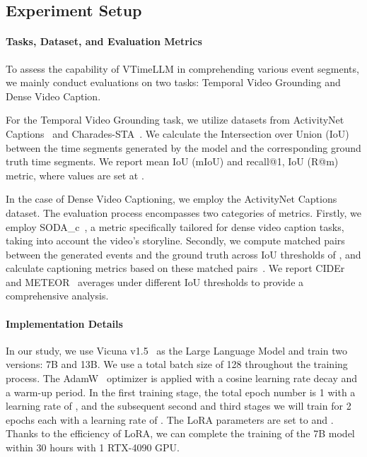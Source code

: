\documentclass[10pt,twocolumn,letterpaper]{article}
\begin{document}
\subsection{Experiment Setup}

\paragraph{Tasks, Dataset, and Evaluation Metrics} To assess the capability of VTimeLLM in comprehending various event segments, we mainly conduct evaluations on two tasks: Temporal Video Grounding and Dense Video Caption. 

For the Temporal Video Grounding task, we utilize datasets from ActivityNet Captions~\cite{anne2017localizing_grounding10} and Charades-STA~\cite{gao2017tall_grounding9}. We calculate the Intersection over Union (IoU) between the time segments generated by the model and the corresponding ground truth time segments. We report mean IoU (mIoU) and recall@1, IoU (R@m) metric, where  values are set at . 

In the case of Dense Video Captioning, we employ the ActivityNet Captions~\cite{anne2017localizing_grounding10} dataset. The evaluation process encompasses two categories of metrics. Firstly, we employ SODA\_c~\cite{fujita2020soda}, a metric specifically tailored for dense video caption tasks, taking into account the video's storyline. Secondly, we compute matched pairs between the generated events and the ground truth across IoU thresholds of , and calculate captioning metrics based on these matched pairs~\cite{yang2023vid2seq}. We report CIDEr~\cite{vedantam2015cider} and METEOR~\cite{banerjee2005meteor} averages under different IoU thresholds to provide a comprehensive analysis.

\paragraph{Implementation Details} In our study, we use Vicuna v1.5~\cite{vicuna2023} as the Large Language Model and train two versions: 7B and 13B. We use a total batch size of 128 throughout the training process. The AdamW~\cite{loshchilov2017decoupled_adamw} optimizer is applied with a cosine learning rate decay and a warm-up period. In the first training stage, the total epoch number is 1 with a learning rate of , and the subsequent second and third stages we will train for 2 epochs each with a learning rate of . The LoRA parameters are set to  and . Thanks to the efficiency of LoRA, we can complete the training of the 7B model within 30 hours with 1 RTX-4090 GPU.
\end{document}
